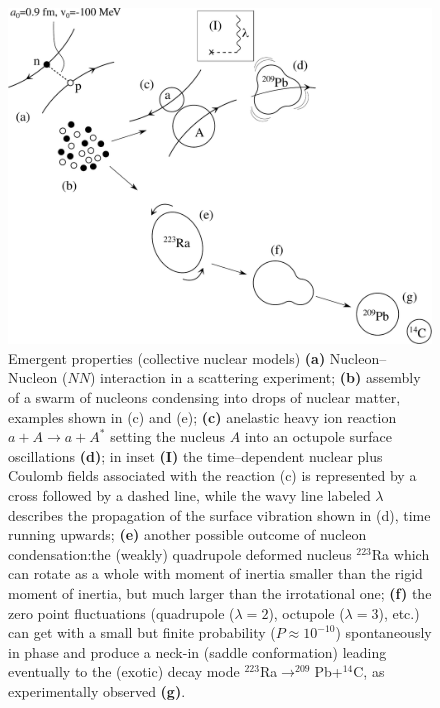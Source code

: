 \documentclass[a4paper,11pt]{book}
\numberwithin{equation}{section}
\numberwithin{figure}{section}
\numberwithin{table}{section}
\begin{document}
\begin{figure}
	\centerline {
		\includegraphics*[width=16cm]{introduccion/figs/figpreface2x}
	}
	\caption{Emergent properties (collective nuclear models) \textbf{(a)} Nucleon--Nucleon ($NN$) interaction in a scattering experiment; \textbf{(b)} assembly of a swarm of nucleons condensing into drops of nuclear matter, examples shown in (c) and (e); \textbf{(c)} anelastic heavy ion reaction $a+A\to a+A^*$ setting the nucleus $A$ into an octupole surface oscillations \textbf{(d)}; in inset \textbf{(I)} the time--dependent nuclear plus Coulomb fields associated with the reaction (c) is represented by a cross followed by a dashed line, while the wavy line labeled $\lambda$ describes the propagation of the surface vibration shown in (d), time running upwards; \textbf{(e)} another possible outcome of nucleon condensation:the (weakly) quadrupole deformed nucleus $^{223}$Ra which can rotate as a whole with moment of inertia smaller than the rigid moment of inertia, but much larger than the irrotational one; \textbf{(f)} the zero point fluctuations  (quadrupole ($\lambda=2$), octupole ($\lambda=3$), etc.) can get with a small but finite probability ($P\approx10^{-10}$) spontaneously in phase and produce a neck-in (saddle conformation) leading eventually to the (exotic) decay mode  $^{223}$Ra$\to^{209}$Pb+$^{14}$C, as experimentally observed \textbf{(g)}.}
	\label{fig1.0.2}
\end{figure}
\end{document}
